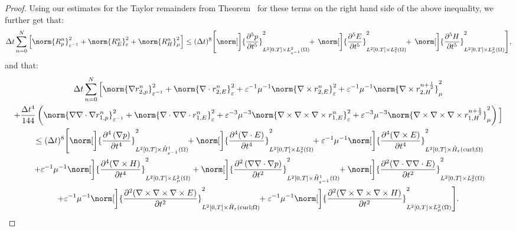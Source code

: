 \documentclass{amsart}
\theoremstyle{thmstyleone}%
\theoremstyle{thmstyletwo}%
\theoremstyle{thmstylethree}%
\DeclareMathOperator{\curl}{curl}
\begin{document}
\begin{proof}
Using our estimates for the Taylor remainders from Theorem~ for these terms on the right hand side of the above inequality, we further get that:
\[
  \Delta t \sum\limits_{n = 0}^N \Big[ \norm{R^n_p}^2_{\varepsilon^{-1}} + \norm{R^n_E}^2_{\varepsilon} + \norm{R^n_H}^2_\mu \Big] \le (\Delta t)^8 \Bigg[ \norm[\bigg]{\dfrac{\partial^5 p}{\partial t^5}}^2_{L^2[0, T] \times L^2_{\varepsilon^{-1}}(\Omega)} \!\! + \, \norm[\bigg]{\dfrac{\partial^5 E}{\partial t^5}}^2_{L^2[0, T] \times L^2_\varepsilon(\Omega)} \!\! + \, \norm[\bigg]{\dfrac{\partial^5 H}{\partial t^5}}^2_{L^2[0, T] \times L^2_\mu(\Omega)} \Bigg],
\]
and that:
\begin{multline*}
  \Delta t \sum\limits_{n = 0}^N \Big[\norm{\nabla r_{2,p}^n} ^2_{\varepsilon^{-1}} + \norm{\nabla \cdot r_{2,E}^n}^2_{\varepsilon} + \varepsilon^{-1} \mu^{-1} \norm{\nabla \times r_{2,E}^n}^2_{\varepsilon} +  \varepsilon^{-1} \mu^{-1} \norm{\nabla \times r_{2,H}^{n + \frac{1}{2}}}^2_{\mu}  \\
+  \dfrac{\Delta t^4}{144} \left( \norm{\nabla \nabla \cdot \nabla r_{1,p}^n} ^2_{\varepsilon^{-1}} + \norm{\nabla \cdot \nabla \nabla \cdot r_{1,E}^n}^2_{\varepsilon} + \varepsilon^{-3} \mu^{-3} \norm{\nabla \times \nabla \times \nabla \times r_{1,E}^n}^2_{\varepsilon} +  \varepsilon^{-3} \mu^{-3} \norm{\nabla \times \nabla \times \nabla \times r_{1,H}^{n + \frac{1}{2}}}^2_{\mu} \right) \Big] \\ \le (\Delta t)^8 \Bigg[ \norm[\bigg]{\dfrac{\partial^4 \left(\nabla p \right)}{\partial t^4}}^2_{L^2[0, T] \times \mathring{H}^1_{\varepsilon^{-1}}(\Omega)} \!\! + 
  \norm[\bigg]{\dfrac{\partial^4 (\nabla \cdot E)}{\partial t^4}}^2_{L^2[0, T] \times L^2_\varepsilon(\Omega)} \!\! + \varepsilon^{-1} \mu^{-1} \norm[\bigg]{\dfrac{\partial^4 (\nabla \times E)}{\partial t^4}}^2_{L^2[0, T] \times \mathring{H}_\varepsilon(\curl; \Omega)} \!\! \\ + \varepsilon^{-1} \mu^{-1} \norm[\bigg]{\dfrac{\partial^4 (\nabla \times H)}{\partial t^4}}^2_{L^2[0, T] \times L^2_\mu(\Omega)} + \norm[\bigg]{\dfrac{\partial^2 \left(\nabla \nabla \cdot \nabla p \right)}{\partial t^2}}^2_{L^2[0, T] \times \mathring{H}^1_{\varepsilon^{-1}}(\Omega)} \!\! + 
  \norm[\bigg]{\dfrac{\partial^2 (\nabla \cdot \nabla \nabla \cdot E)}{\partial t^2}}^2_{L^2[0, T] \times L^2_\varepsilon(\Omega)} \!\! \\ + \varepsilon^{-1} \mu^{-1} \norm[\bigg]{\dfrac{\partial^2 (\nabla \times \nabla \times \nabla \times E)}{\partial t^2}}^2_{L^2[0, T] \times \mathring{H}_\varepsilon(\curl; \Omega)} \!\! + \varepsilon^{-1} \mu^{-1} \norm[\bigg]{\dfrac{\partial^2 (\nabla \times \nabla \times \nabla \times H)}{\partial t^2}}^2_{L^2[0, T] \times L^2_\mu(\Omega)} \Bigg].

\end{multline*}
\end{proof}
\end{document}
